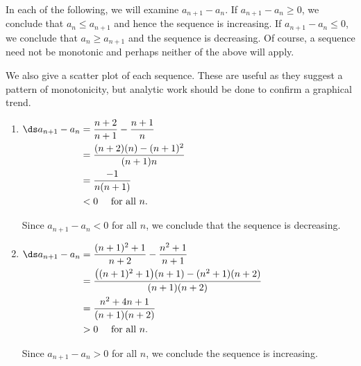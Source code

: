 {In each of the following, we will examine $a_{n+1}-a_n$. If $a_{n+1}-a_n \geq 0$, we conclude that $a_n\leq a_{n+1}$ and hence the sequence is increasing. If $a_{n+1}-a_n\leq 0$, we conclude that $a_n\geq a_{n+1}$ and the sequence is decreasing. Of course, a sequence need not be monotonic and perhaps neither of the above will apply.

We also give a scatter plot of each sequence. These are useful as they suggest a pattern of monotonicity, but analytic work should be done to confirm a graphical trend.

\begin{enumerate}
\item	\hfill	$\ds\begin{aligned}[t] a_{n+1}-a_n &= \frac{n+2}{n+1} - \frac{n+1}{n} \\		
					&= \frac{(n+2)(n)-(n+1)^2}{(n+1)n} \\
					&=	\frac{-1}{n(n+1)} \\
					&<0 \quad\text{ for all $n$.}
				\end{aligned}$ \hfill\null
				
Since $a_{n+1}-a_n<0$ for all $n$, we conclude that the sequence is decreasing.


\item		\hfill $\ds \begin{aligned}[t]	
						a_{n+1}-a_n &= \frac{(n+1)^2+1}{n+2} - \frac{n^2+1}{n+1} \\		
								&= \frac{\big((n+1)^2+1\big)(n+1)- (n^2+1)(n+2)}{(n+1)(n+2)}\\
								&=	\frac{n^2+4n+1}{(n+1)(n+2)} \\
								&> 0 \quad \text{ for all $n$.}
					\end{aligned}$\hfill \null
					
Since $a_{n+1}-a_n>0$ for all $n$, we conclude the sequence is increasing.
\drawexampleline


\end{enumerate}}
